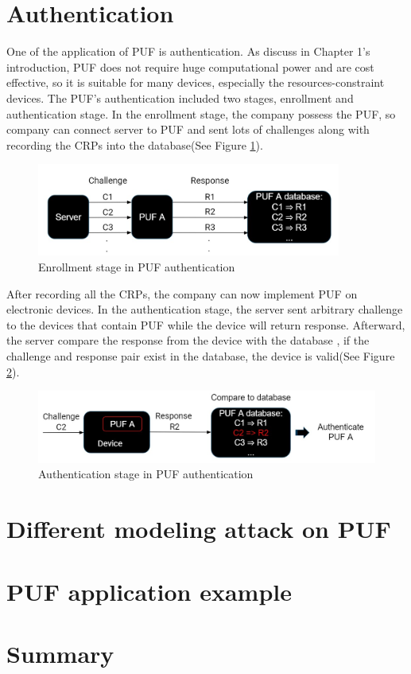 \section{Authentication}
One of the application of PUF is authentication. As discuss in Chapter 1's introduction, PUF does not require huge computational power and are cost effective, so it is suitable for many devices,
especially the resources-constraint devices. The PUF's authentication included two stages, enrollment and authentication stage. In the enrollment stage, the company possess the PUF, so
company can connect server to PUF and sent lots of challenges along with recording the CRPs into the database(See Figure \ref{fig:figure4}).

\begin{figure}[ht]
    \centering
    \includegraphics[width=10cm]{figures/figure4.jpg}
    \caption{Enrollment stage in PUF authentication}
    \label{fig:figure4}
    \end{figure}

After recording all the CRPs, the company can now implement PUF on electronic devices.
In the authentication stage, the server sent arbitrary challenge to the devices that contain PUF while the device will return response. Afterward, the server compare the response from the device with the database 
, if the challenge and response pair exist in the database, the device is valid(See Figure \ref{fig:figure5}).

\begin{figure}[ht]
    \centering
    \includegraphics[width=12cm]{figures/figure5.jpg}
    \caption{Authentication stage in PUF authentication}
    \label{fig:figure5}
    \end{figure}

\section{Different modeling attack on PUF}

\section{PUF application example}


\section{Summary}


